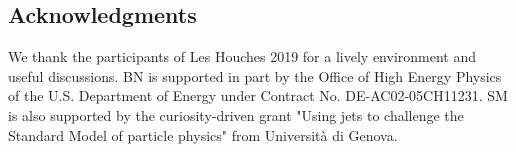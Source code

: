 \documentclass[11pt]{cernrep}
\begin{document}
\subsection*{Acknowledgments}

We thank the participants of Les Houches 2019 for a lively environment and useful discussions.
BN is supported in part by the Office of High Energy Physics of the U.S. Department of Energy under Contract No. DE-AC02-05CH11231.
%
SM is also supported by the curiosity-driven grant "Using jets to challenge the Standard Model of particle physics" from Universit\`a di Genova.


\end{document}
